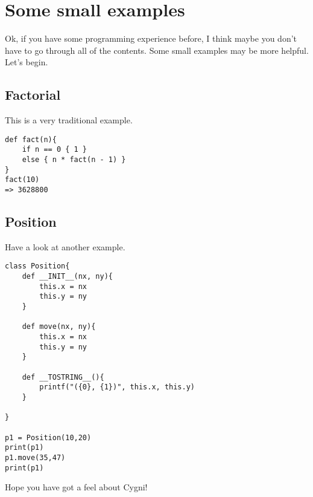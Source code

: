 \chapter{Some small examples}
Ok, if you have some programming experience before, I think maybe you don't have to go through all of the contents. Some small examples may be more helpful. Let's begin.


\section{Factorial}
This is a very traditional example. 


\begin{lstlisting}
def fact(n){
	if n == 0 { 1 }
	else { n * fact(n - 1) }
}
fact(10)
=> 3628800
\end{lstlisting}

\section{Position}
Have a look at another example.
\begin{lstlisting}
class Position{
	def __INIT__(nx, ny){
		this.x = nx
		this.y = ny
	}
	
	def move(nx, ny){
		this.x = nx
		this.y = ny
	}
	
	def __TOSTRING__(){
		printf("({0}, {1})", this.x, this.y)
	}
	
}

p1 = Position(10,20)
print(p1)
p1.move(35,47)
print(p1)
\end{lstlisting}	

Hope you have got a feel about Cygni!